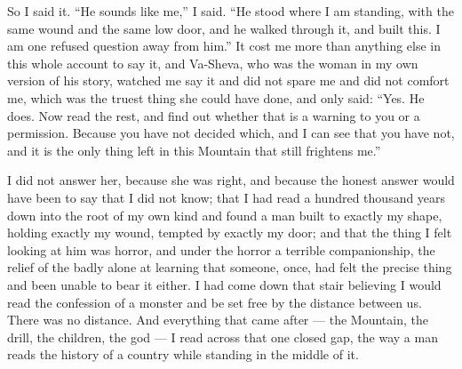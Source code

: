 So I said it. ``He sounds like me,'' I said. ``He stood where I am standing, with the same wound and the same low door, and he walked through it, and built this. I am one refused question away from him.'' It cost me more than anything else in this whole account to say it, and Va-Sheva, who was the woman in my own version of his story, watched me say it and did not spare me and did not comfort me, which was the truest thing she could have done, and only said: ``Yes. He does. Now read the rest, and find out whether that is a warning to you or a permission. Because you have not decided which, and I can see that you have not, and it is the only thing left in this Mountain that still frightens me.''\par

I did not answer her, because she was right, and because the honest answer would have been to say that I did not know; that I had read a hundred thousand years down into the root of my own kind and found a man built to exactly my shape, holding exactly my wound, tempted by exactly my door; and that the thing I felt looking at him was horror, and under the horror a terrible companionship, the relief of the badly alone at learning that someone, once, had felt the precise thing and been unable to bear it either. I had come down that stair believing I would read the confession of a monster and be set free by the distance between us. There was no distance. And everything that came after --- the Mountain, the drill, the children, the god --- I read across that one closed gap, the way a man reads the history of a country while standing in the middle of it.\par

\ornament
